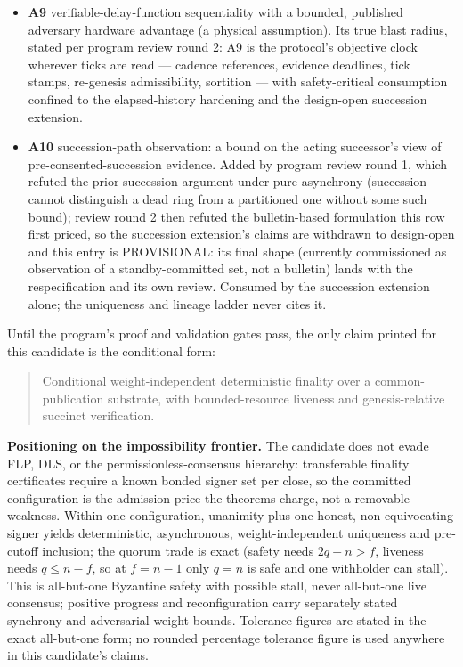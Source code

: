 \documentclass[
  11pt,
]{article}
\begin{document}
\begin{itemize}
  (everlasting safety against later compromise of former members,
  including full-media imaging).
\item
  \textbf{A9} verifiable-delay-function sequentiality with a bounded,
  published adversary hardware advantage (a physical assumption). Its
  true blast radius, stated per program review round 2: A9 is the
  protocol's objective clock wherever ticks are read — cadence
  references, evidence deadlines, tick stamps, re-genesis admissibility,
  sortition — with safety-critical consumption confined to the
  elapsed-history hardening and the design-open succession extension.
\item
  \textbf{A10} succession-path observation: a bound on the acting
  successor's view of pre-consented-succession evidence. Added by
  program review round 1, which refuted the prior succession argument
  under pure asynchrony (succession cannot distinguish a dead ring from
  a partitioned one without some such bound); review round 2 then
  refuted the bulletin-based formulation this row first priced, so the
  succession extension's claims are withdrawn to design-open and this
  entry is PROVISIONAL: its final shape (currently commissioned as
  observation of a standby-committed set, not a bulletin) lands with the
  respecification and its own review. Consumed by the succession
  extension alone; the uniqueness and lineage ladder never cites it.
\end{itemize}

Until the program's proof and validation gates pass, the only claim printed
for this candidate is the conditional form:

\begin{quote}
Conditional weight-independent deterministic finality over a
common-publication substrate, with bounded-resource liveness and
genesis-relative succinct verification.
\end{quote}

\textbf{Positioning on the impossibility frontier.} The candidate does not
evade FLP, DLS, or the permissionless-consensus hierarchy: transferable
finality certificates require a known bonded signer set per close, so the
committed configuration is the admission price the theorems charge, not a
removable weakness. Within one configuration, unanimity plus one honest,
non-equivocating signer yields deterministic, asynchronous,
weight-independent uniqueness and pre-cutoff inclusion; the quorum trade is
exact (safety needs \(2q - n > f\), liveness needs \(q \leq n - f\), so at
\(f = n-1\) only \(q = n\) is safe and one withholder can stall). This is
all-but-one Byzantine safety with possible stall, never all-but-one live
consensus; positive progress and reconfiguration carry separately stated
synchrony and adversarial-weight bounds. Tolerance figures are stated in
the exact all-but-one form; no rounded percentage tolerance figure is used
anywhere in this candidate's claims.
\end{document}
